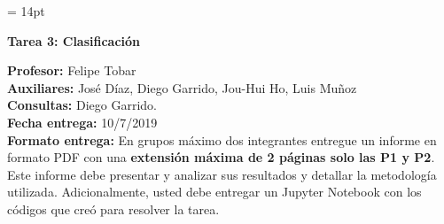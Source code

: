 \documentclass[11pt,letterpaper]{article}
\begin{document}
\pagestyle{fancy}
\fancyhf{}

\headheight = 14pt
\begin{center}
\large {\textbf{Tarea 3: Clasificación}}\\
\end{center}
\textbf{Profesor:} Felipe Tobar\\ 
\textbf{Auxiliares:} José Díaz, Diego Garrido, Jou-Hui Ho, Luis Muñoz \\
\textbf{Consultas:} Diego Garrido.\\
\textbf{Fecha entrega:} 10/7/2019 \\
\textbf{Formato entrega:} En grupos máximo dos integrantes entregue un informe en formato PDF con una \textbf{extensión máxima de 2 páginas solo las P1 y P2}. Este informe debe presentar y analizar sus resultados y detallar la metodología utilizada. Adicionalmente, usted debe entregar un Jupyter Notebook con los códigos que creó para resolver la tarea.\\
\end{document}
